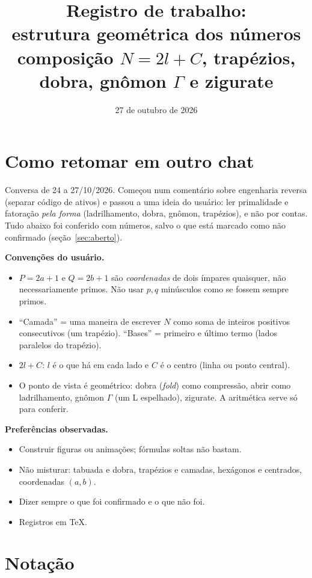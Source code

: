 \documentclass[11pt,a4paper]{article}
\title{Registro de trabalho:\\ estrutura geométrica dos números\\
\large composição $N=2l+C$, trapézios, dobra, gnômon $\Gamma$ e zigurate}
\date{27 de outubro de 2026}
\author{}
\begin{document}
\maketitle

\section{Como retomar em outro chat}

Conversa de 24 a 27/10/2026. Começou num comentário sobre engenharia reversa (separar código de ativos) e passou a uma ideia do usuário: ler primalidade e fatoração \emph{pela forma} (ladrilhamento, dobra, gnômon, trapézios), e não por contas. Tudo abaixo foi conferido com números, salvo o que está marcado como não confirmado (seção~\ref{sec:aberto}).

\textbf{Convenções do usuário.}
\begin{itemize}[leftmargin=1.4em]
  \item $P=2a+1$ e $Q=2b+1$ são \emph{coordenadas} de dois ímpares quaisquer, não necessariamente primos. Não usar $p,q$ minúsculos como se fossem sempre primos.
  \item ``Camada'' = uma maneira de escrever $N$ como soma de inteiros positivos consecutivos (um trapézio). ``Bases'' = primeiro e último termo (lados paralelos do trapézio).
  \item $2l+C$: $l$ é o que há em cada lado e $C$ é o centro (linha ou ponto central).
  \item O ponto de vista é geométrico: dobra (\emph{fold}) como compressão, abrir como ladrilhamento, gnômon $\Gamma$ (um L espelhado), zigurate. A aritmética serve só para conferir.
\end{itemize}

\textbf{Preferências observadas.}
\begin{itemize}[leftmargin=1.4em]
  \item Construir figuras ou animações; fórmulas soltas não bastam.
  \item Não misturar: tabuada e dobra, trapézios e camadas, hexágonos e centrados, coordenadas $(a,b)$.
  \item Dizer sempre o que foi confirmado e o que não foi.
  \item Registros em TeX.
\end{itemize}

\section{Notação}
\end{document}
